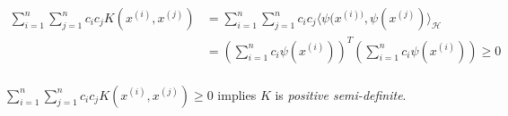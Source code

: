 \documentclass[13pt]{article}
\begin{document}
\begin{align*}
\sum_{i=1}^n \sum_{j=1}^n c_i c_j K\left(x^{(i)}, x^{(j)}\right) &= \sum_{i=1}^n \sum_{j=1}^n c_i c_j \langle\psi(x^{(i))}, \psi(x^{(j)})\rangle_{\mathcal{H}}\\
&= \left(\sum_{i=1}^n c_i \psi(x^{(i)}) \right)^T\left(\sum_{i=1}^n c_i \psi(x^{(i)}) \right) \ge 0\\
\end{align*}

$\sum_{i=1}^n \sum_{j=1}^n c_i c_j K\left(x^{(i)}, x^{(j)}\right) \ge 0$ implies $K$ is \textit{positive semi-definite}.
\end{document}
